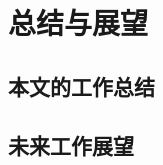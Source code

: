 \chapter{总结与展望}\label{cha:conclusion}

\section{本文的工作总结}\label{sec:conclusion}

\section{未来工作展望}\label{sec:future_work}
